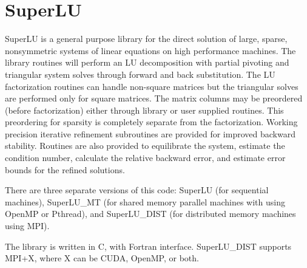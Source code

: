 \section{SuperLU}
SuperLU is a general purpose library for the direct solution of large, sparse,
nonsymmetric systems of linear equations on high performance machines. 
The library routines will perform an LU decomposition with partial pivoting
and triangular system solves through forward and back substitution. The LU factorization routines can handle non-square matrices but the triangular solves are performed only for
square matrices. The matrix columns may be preordered (before factorization) either through
library or user supplied routines. This preordering for sparsity is completely separate
from the factorization. Working precision iterative refinement subroutines are provided for
improved backward stability. Routines are also provided to equilibrate the system, estimate
the condition number, calculate the relative backward error, and estimate error bounds for
the refined solutions.

There are three separate versions of this code: SuperLU (for sequential machines),
SuperLU\_MT (for shared memory parallel machines with using OpenMP or Pthread), and
SuperLU\_DIST (for distributed memory machines using MPI).

The library is written in C, with Fortran interface.  SuperLU\_DIST supports MPI+X,
where X can be CUDA, OpenMP, or both.
